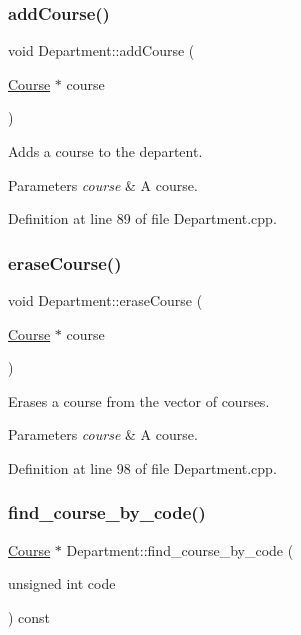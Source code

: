 \subsubsection{\texorpdfstring{add\+Course()}{addCourse()}}
{\footnotesize\ttfamily void Department\+::add\+Course (\begin{DoxyParamCaption}\item[{\hyperlink{classCourse}{Course} $\ast$}]{course }\end{DoxyParamCaption})}

Adds a course to the departent. 
\begin{DoxyParams}{Parameters}
{\em course} & A course. \\
\hline
\end{DoxyParams}


Definition at line 89 of file Department.\+cpp.

\mbox{\label{classDepartment_a01acd70fa3c49ebe0d729a910c842078}} 
\subsubsection{\texorpdfstring{erase\+Course()}{eraseCourse()}}
{\footnotesize\ttfamily void Department\+::erase\+Course (\begin{DoxyParamCaption}\item[{\hyperlink{classCourse}{Course} $\ast$}]{course }\end{DoxyParamCaption})}

Erases a course from the vector of courses. 
\begin{DoxyParams}{Parameters}
{\em course} & A course. \\
\hline
\end{DoxyParams}


Definition at line 98 of file Department.\+cpp.

\mbox{\label{classDepartment_af8e8a8aa806e5925c07686cadd70fde2}} 
\subsubsection{\texorpdfstring{find\+\_\+course\+\_\+by\+\_\+code()}{find\_course\_by\_code()}}
{\footnotesize\ttfamily \hyperlink{classCourse}{Course} $\ast$ Department\+::find\+\_\+course\+\_\+by\+\_\+code (\begin{DoxyParamCaption}\item[{unsigned int}]{code }\end{DoxyParamCaption}) const}

